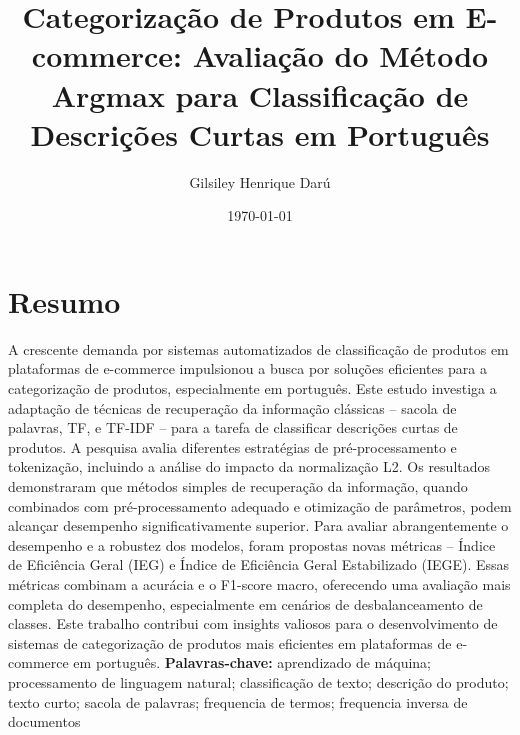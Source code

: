 \documentclass[a4paper,12pt]{report}
\begin{document}
\title{\textbf{Categorização de Produtos em E-commerce: Avaliação do Método Argmax para Classificação de Descrições Curtas em Português}}
\author{Gilsiley Henrique Darú}

\date{\today}
\maketitle

\chapter*{Resumo}

A crescente demanda por sistemas automatizados de classificação de produtos em plataformas de e-commerce impulsionou a busca por soluções eficientes para a categorização de produtos, especialmente em português. Este estudo investiga a adaptação de técnicas de recuperação da informação clássicas – sacola de palavras, TF, e TF-IDF – para a tarefa de classificar descrições curtas de produtos. A pesquisa avalia diferentes estratégias de pré-processamento e tokenização, incluindo a análise do impacto da normalização L2. Os resultados demonstraram que métodos simples de recuperação da informação, quando combinados com pré-processamento adequado e otimização de parâmetros, podem alcançar desempenho significativamente superior. Para avaliar abrangentemente o desempenho e a robustez dos modelos, foram propostas novas métricas – Índice de Eficiência Geral (IEG) e Índice de Eficiência Geral Estabilizado (IEGE). Essas métricas combinam a acurácia e o F1-score macro, oferecendo uma avaliação mais completa do desempenho, especialmente em cenários de desbalanceamento de classes. Este trabalho contribui com insights valiosos para o desenvolvimento de sistemas de categorização de produtos mais eficientes em plataformas de e-commerce em português.         
				\vspace{0.15cm}
        \noindent \textbf{Palavras-chave:} aprendizado de máquina; processamento de linguagem natural; classificação de texto; descrição do produto; texto curto; sacola de palavras; frequencia de termos; frequencia inversa de documentos

	
     

\tableofcontents






\end{document}
